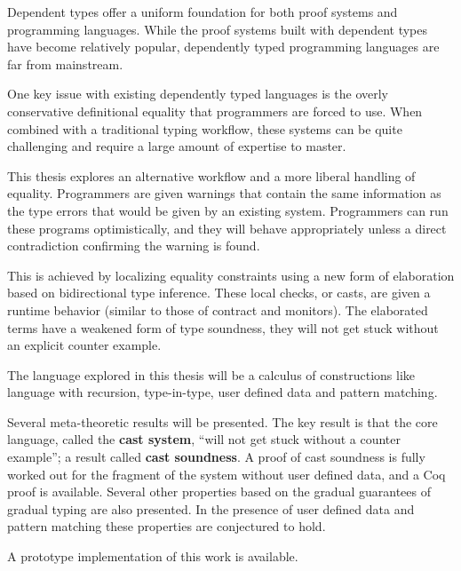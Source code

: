Dependent types offer a uniform foundation for both proof systems and programming languages.
While the proof systems built with dependent types have become relatively popular, dependently typed programming languages are far from mainstream.

One key issue with existing dependently typed languages is the overly conservative definitional equality that programmers are forced to use.
When combined with a traditional typing workflow, these systems can be quite challenging and require a large amount of expertise to master.

This thesis explores an alternative workflow and a more liberal handling of equality.
Programmers are given warnings that contain the same information as the type errors that would be given by an existing system.
Programmers can run these programs optimistically, and they will behave appropriately unless a direct contradiction confirming the warning is found.

This is achieved by localizing equality constraints using a new form of elaboration based on bidirectional type inference.
These local checks, or casts, are given a runtime behavior (similar to those of contract and monitors).
The elaborated terms have a weakened form of type soundness, they will not get stuck without an explicit counter example.

The language explored in this thesis will be a calculus of constructions like language with recursion, type-in-type, user defined data and pattern matching.

Several meta-theoretic results will be presented.
The key result is that the core language, called the \textbf{cast system}, ``will not get stuck without a counter example''; a result called \textbf{cast soundness}.
A proof of cast soundness is fully worked out for the fragment of the system without user defined data, and a Coq proof is available. Several other properties based on the gradual guarantees of gradual typing are also presented.
In the presence of user defined data and pattern matching these properties are conjectured to hold.

A prototype implementation of this work is available.

